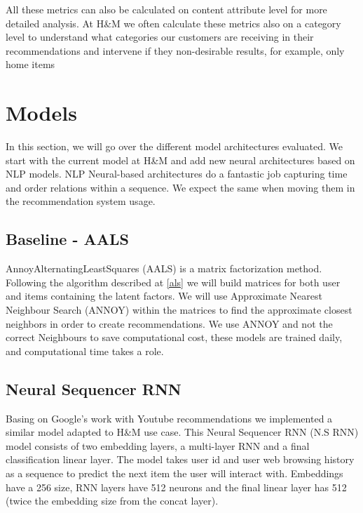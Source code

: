 \documentclass{kththesis}
\begin{document}
All these metrics can also be calculated on content attribute level for more detailed analysis. At H\&M we often calculate these metrics also on a category level to understand what categories our customers are receiving in their recommendations and intervene if they non-desirable results, for example, only home items 


\chapter{Models}
In this section, we will go over the different model architectures evaluated. We start with the current model at H\&M and add new neural architectures based on NLP models. NLP Neural-based architectures do a fantastic job capturing time and order relations within a sequence. We expect the same when moving them in the recommendation system usage.

\section{Baseline - AALS}
AnnoyAlternatingLeastSquares (AALS) is a matrix factorization method. Following the algorithm described at \ref{als} we will build matrices for both user and items containing the latent factors. We will use Approximate Nearest Neighbour Search\cite{annoy} (ANNOY) within the matrices to find the approximate closest neighbors in order to create recommendations. We use ANNOY and not the correct Neighbours to save computational cost, these models are trained daily, and computational time takes a role.


\section{Neural Sequencer RNN}
Basing on Google's work with Youtube recommendations \cite{rnn-youtube} we implemented a similar model adapted to H\&M use case. This Neural Sequencer RNN (N.S RNN) model consists of two embedding layers, a multi-layer RNN and a final classification linear layer. The model takes user id and user web browsing history as a sequence to predict the next item the user will interact with. Embeddings have a 256 size, RNN layers have 512 neurons and the final linear layer has 512 (twice the embedding size from the concat layer). 
\end{document}
